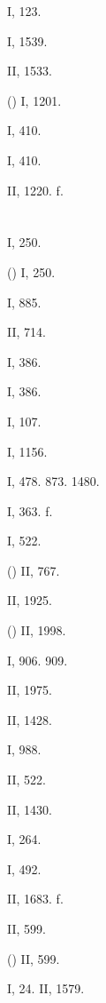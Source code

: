  I, 123.

 I, 1539.

 II, 1533.

 () I, 1201.

 I, 410.

 I, 410.

 II, 1220. f.

\section{}

 I, 250.

 () I, 250.

 I, 885.

 II, 714.

 I, 386.

 I, 386.

 I, 107.

 I, 1156.

 I, 478. 873. 1480.

 I, 363. f.

 I, 522.

 () II, 767.

 II, 1925.

 () II, 1998.

 I, 906. 909.

 II, 1975.

 II, 1428.

 I, 988.

 II, 522.

 II, 1430.

 I, 264.

 I, 492.

 II, 1683. f.

 II, 599.

 () II, 599.

 I, 24. II, 1579.

